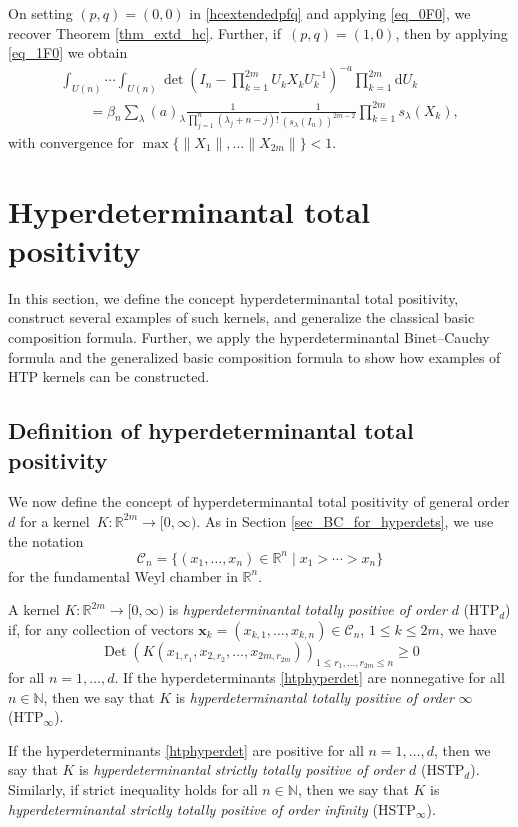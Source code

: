 \documentclass[10pt,a4paper]{amsart}
\numberwithin{equation}{section}
\def\N{{\mathbb N}}
\def\R{{\mathbb R}}
\def\dd{ \mathrm{d}}
\def\Det{\operatorname{Det}}
\def\CC{\mathcal{C}}
\def\xx{\boldsymbol{x}}
\begin{document}
On setting $(p,q)=(0,0)$ in \eqref{hcextendedpfq} and applying \eqref{eq_0F0}, we recover Theorem \ref{thm_extd_hc}. Further, if~${(p,q)=(1,0)}$, then by applying \eqref{eq_1F0} we obtain
\begin{gather*}
\int_{U(n)} \cdots \int_{U(n)} \det\left(I_n - \prod_{k=1}^{2m} U_k X_k U_k^{-1}\right)^{-a} \prod_{k=1}^{2m} \dd U_k \\
\qquad= \beta_n \sum_\lambda (a)_\lambda \frac{1}{\prod_{j=1}^n (\lambda_j + n-j)!} \frac{1}{(s_\lambda(I_n))^{2m-2}} \prod_{k=1}^{2m} s_\lambda(X_k),
\end{gather*}
with convergence for $\max\{\|X_1\|,\dots\|X_{2m}\|\} < 1$.


\section{Hyperdeterminantal total positivity}\label{sec_HTP}

In this section, we define the concept hyperdeterminantal total positivity, construct several examples of such kernels, and generalize the classical basic composition formula. Further, we apply the hyperdeterminantal Binet--Cauchy formula and the generalized basic composition formula to show how examples of HTP kernels can be constructed.

\subsection{Definition of hyperdeterminantal total positivity}

We now define the concept of hyperdeterminantal total positivity of general order $d$ for a kernel~${K\colon \R^{2m} \to [0,\infty)}$. As in Section \ref{sec_BC_for_hyperdets}, we use the notation
\[
\CC_n = \{(x_1,\dots,x_n) \in \R^n\mid x_1 > \cdots > x_n\}
\]
for the fundamental Weyl chamber in $\R^n$.

\begin{Definition}
\label{htpdefinition}
A kernel $K\colon \R^{2m} \to [0,\infty)$ is {\it hyperdeterminantal totally positive of order} $d$ (HTP$_d$) if, for any collection of vectors $\xx_k = (x_{k,1},\dots,x_{k,n}) \in \CC_n$, $1 \le k \le 2m$, we have
\begin{equation}
\label{htphyperdet}
\Det(K(x_{1,r_1},x_{2,r_2},\dots,x_{2m,r_{2m}}))_{1 \le r_1,\dots,r_{2m} \le n} \ge 0
\end{equation}
for all $n = 1,\dots,d$. If the hyperdeterminants \eqref{htphyperdet} are nonnegative for all $n \in \N$, then we say that $K$ is {\it hyperdeterminantal totally positive of order} $\infty$ (HTP$_\infty$).

If the hyperdeterminants \eqref{htphyperdet} are positive for all $n = 1,\dots,d$, then we say that $K$ is {\it hyperdeterminantal strictly totally positive of order} $d$ (HSTP$_d$). Similarly, if strict inequality holds for all $n \in \N$, then we say that $K$ is {\it hyperdeterminantal strictly totally positive of order infinity} (HSTP$_\infty$).
\end{Definition}
\end{document}
